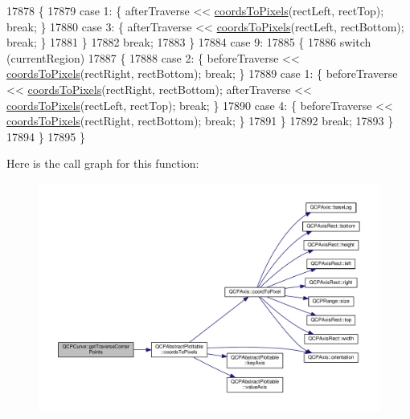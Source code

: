 \begin{DoxyCode}
17878       \{
17879         \textcolor{keywordflow}{case} 1: \{ afterTraverse << \hyperlink{class_q_c_p_abstract_plottable_ade710a776104b14c1c835168ce1bfc5c}{coordsToPixels}(rectLeft, rectTop); \textcolor{keywordflow}{break}; \}
17880         \textcolor{keywordflow}{case} 3: \{ afterTraverse << \hyperlink{class_q_c_p_abstract_plottable_ade710a776104b14c1c835168ce1bfc5c}{coordsToPixels}(rectLeft, rectBottom); \textcolor{keywordflow}{break}; \}
17881       \}
17882       \textcolor{keywordflow}{break};
17883     \}
17884     \textcolor{keywordflow}{case} 9:
17885     \{
17886       \textcolor{keywordflow}{switch} (currentRegion)
17887       \{
17888         \textcolor{keywordflow}{case} 2: \{ beforeTraverse << \hyperlink{class_q_c_p_abstract_plottable_ade710a776104b14c1c835168ce1bfc5c}{coordsToPixels}(rectRight, rectBottom); \textcolor{keywordflow}{break}; \}
17889         \textcolor{keywordflow}{case} 1: \{ beforeTraverse << \hyperlink{class_q_c_p_abstract_plottable_ade710a776104b14c1c835168ce1bfc5c}{coordsToPixels}(rectRight, rectBottom); afterTraverse << 
      \hyperlink{class_q_c_p_abstract_plottable_ade710a776104b14c1c835168ce1bfc5c}{coordsToPixels}(rectLeft, rectTop); \textcolor{keywordflow}{break}; \}
17890         \textcolor{keywordflow}{case} 4: \{ beforeTraverse << \hyperlink{class_q_c_p_abstract_plottable_ade710a776104b14c1c835168ce1bfc5c}{coordsToPixels}(rectRight, rectBottom); \textcolor{keywordflow}{break}; \}
17891       \}
17892       \textcolor{keywordflow}{break};
17893     \}
17894   \}
17895 \}
\end{DoxyCode}


Here is the call graph for this function\+:\nopagebreak
\begin{figure}[H]
\begin{center}
\leavevmode
\includegraphics[width=350pt]{class_q_c_p_curve_abe1721b19669e7127d76d144660fbeb8_cgraph}
\end{center}
\end{figure}




